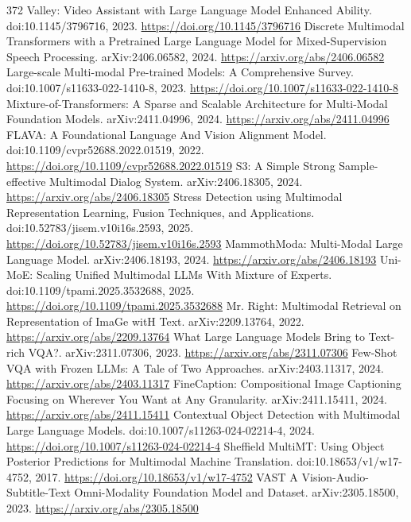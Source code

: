\documentclass[11pt]{article}
\begin{document}
\begin{thebibliography}{372}
 Valley: Video Assistant with Large Language Model Enhanced Ability. doi:10.1145/3796716, 2023. \url{https://doi.org/10.1145/3796716}
 Discrete Multimodal Transformers with a Pretrained Large Language Model for Mixed-Supervision Speech Processing. arXiv:2406.06582, 2024. \url{https://arxiv.org/abs/2406.06582}
 Large-scale Multi-modal Pre-trained Models: A Comprehensive Survey. doi:10.1007/s11633-022-1410-8, 2023. \url{https://doi.org/10.1007/s11633-022-1410-8}
 Mixture-of-Transformers: A Sparse and Scalable Architecture for Multi-Modal Foundation Models. arXiv:2411.04996, 2024. \url{https://arxiv.org/abs/2411.04996}
 FLAVA: A Foundational Language And Vision Alignment Model. doi:10.1109/cvpr52688.2022.01519, 2022. \url{https://doi.org/10.1109/cvpr52688.2022.01519}
 S3: A Simple Strong Sample-effective Multimodal Dialog System. arXiv:2406.18305, 2024. \url{https://arxiv.org/abs/2406.18305}
 Stress Detection using Multimodal Representation Learning, Fusion Techniques, and Applications. doi:10.52783/jisem.v10i16s.2593, 2025. \url{https://doi.org/10.52783/jisem.v10i16s.2593}
 MammothModa: Multi-Modal Large Language Model. arXiv:2406.18193, 2024. \url{https://arxiv.org/abs/2406.18193}
 Uni-MoE: Scaling Unified Multimodal LLMs With Mixture of Experts. doi:10.1109/tpami.2025.3532688, 2025. \url{https://doi.org/10.1109/tpami.2025.3532688}
 Mr. Right: Multimodal Retrieval on Representation of ImaGe witH Text. arXiv:2209.13764, 2022. \url{https://arxiv.org/abs/2209.13764}
 What Large Language Models Bring to Text-rich VQA?. arXiv:2311.07306, 2023. \url{https://arxiv.org/abs/2311.07306}
 Few-Shot VQA with Frozen LLMs: A Tale of Two Approaches. arXiv:2403.11317, 2024. \url{https://arxiv.org/abs/2403.11317}
 FineCaption: Compositional Image Captioning Focusing on Wherever You Want at Any Granularity. arXiv:2411.15411, 2024. \url{https://arxiv.org/abs/2411.15411}
 Contextual Object Detection with Multimodal Large Language Models. doi:10.1007/s11263-024-02214-4, 2024. \url{https://doi.org/10.1007/s11263-024-02214-4}
 Sheffield MultiMT: Using Object Posterior Predictions for Multimodal Machine Translation. doi:10.18653/v1/w17-4752, 2017. \url{https://doi.org/10.18653/v1/w17-4752}
 VAST A Vision-Audio-Subtitle-Text Omni-Modality Foundation Model and Dataset. arXiv:2305.18500, 2023. \url{https://arxiv.org/abs/2305.18500}

\end{thebibliography}
\end{document}
